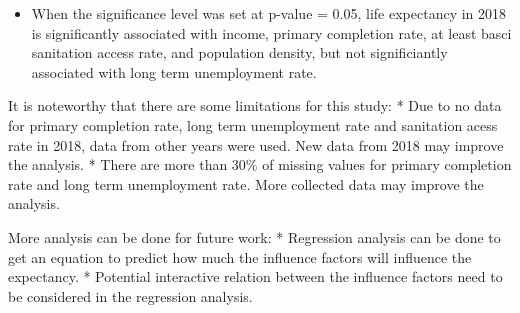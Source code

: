 \documentclass[11pt]{article}
\providecommand{\tightlist}{%
      \setlength{\itemsep}{0pt}\setlength{\parskip}{0pt}}
\begin{document}
\begin{itemize}
\tightlist
\item
  When the significance level was set at p-value = 0.05, life expectancy
  in 2018 is significantly associated with income, primary completion
  rate, at least basci sanitation access rate, and population density,
  but not significiantly associated with long term unemployment rate.
\end{itemize}

It is noteworthy that there are some limitations for this study: * Due
to no data for primary completion rate, long term unemployment rate and
sanitation acess rate in 2018, data from other years were used. New data
from 2018 may improve the analysis. * There are more than 30\% of
missing values for primary completion rate and long term unemployment
rate. More collected data may improve the analysis.

More analysis can be done for future work: * Regression analysis can be
done to get an equation to predict how much the influence factors will
influence the expectancy. * Potential interactive relation between the
influence factors need to be considered in the regression analysis.


    
    
    
    
\end{document}
